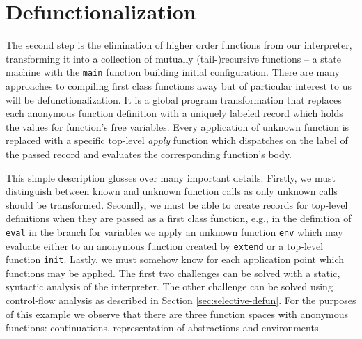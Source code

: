 \section{Defunctionalization}
The second step is the elimination of higher order functions from our interpreter, transforming it into a collection of mutually (tail-)recursive functions -- a state machine with the \texttt{main} function building initial configuration.
There are many approaches to compiling first class functions away but of particular interest to us will be defunctionalization.
It is a global program transformation that replaces each anonymous function definition with a uniquely labeled record which holds the values for function's free variables.
Every application of unknown function is replaced with a specific top-level \textit{apply} function which dispatches on the label of the passed record and evaluates the corresponding function's body.

This simple description glosses over many important details.
Firstly, we must distinguish between known and unknown function calls as only unknown calls should be transformed.
Secondly, we must be able to create records for top-level definitions when they are passed as a first class function, e.g., in the definition of \texttt{eval} in the branch for variables we apply an unknown function \texttt{env} which may evaluate either to an anonymous function created by \texttt{extend} or a top-level function \texttt{init}.
Lastly, we must somehow know for each application point which functions may be applied.
The first two challenges can be solved with a static, syntactic analysis of the interpreter.
The other challenge can be solved using control-flow analysis as described in Section \ref{sec:selective-defun}.
For the purposes of this example we observe that there are three function spaces with anonymous functions: continuations, representation of abstractions and environments.

